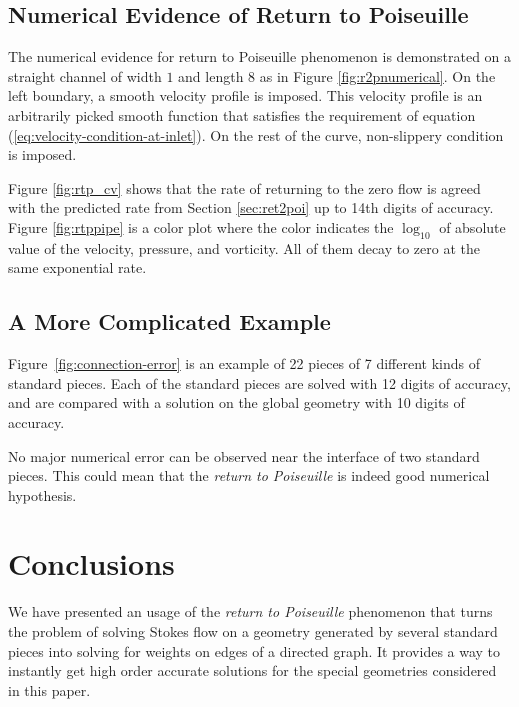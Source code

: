 \documentclass[10pt,twocolumn,letterpaper]{article}
\begin{document}
\subsection{Numerical Evidence of Return to Poiseuille}
The numerical evidence for return to Poiseuille phenomenon is 
demonstrated on a straight channel of width $1$ 
and length $8$ as in Figure \ref{fig:r2pnumerical}.
On the left boundary, a smooth velocity profile is imposed. 
This velocity profile is an arbitrarily picked smooth function 
that satisfies the requirement of equation (\ref{eq:velocity-condition-at-inlet}). 
On the rest of the curve, non-slippery condition is imposed.

Figure \ref{fig:rtp_cv} shows that the rate of 
returning to the zero flow is agreed with the predicted rate 
from Section \ref{sec:ret2poi} up to 14th digits of accuracy. 
Figure \ref{fig:rtppipe} is a color plot where the color indicates
the $\log_{10}$ of absolute value of the velocity, pressure, and vorticity. 
All of them decay to zero at the same exponential rate. 

\subsection{A More Complicated Example}
Figure~\ref{fig:connection-error} is an example of 22 pieces of
7 different kinds of standard pieces. 
Each of the standard pieces are solved with 12 digits of accuracy,
and are compared with a solution on the global geometry with 10 digits of accuracy. 

No major numerical error can be observed near the interface of two standard pieces. 
This could mean that the \textit{return to Poiseuille} is indeed good numerical hypothesis. 



\section{Conclusions\label{sec:conclusions}}

We have presented an usage of the \textit{return to Poiseuille} phenomenon
that turns the problem of solving Stokes flow on a geometry generated by 
several standard pieces into solving for weights on edges of a directed graph. 
It provides a way to instantly get high order accurate solutions for 
the special geometries considered in this paper. 
\end{document}
